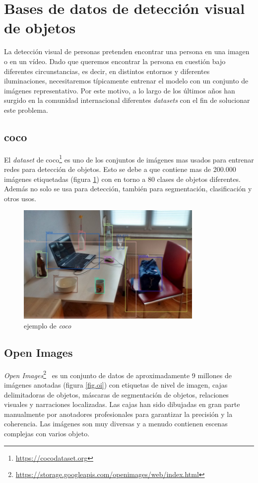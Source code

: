 \section{Bases de datos de detección visual de objetos}
La detección visual de personas pretenden encontrar una persona en una imagen o en un vídeo. Dado que queremos encontrar la persona en cuestión bajo diferentes circunstancias, es decir, en distintos entornos y diferentes iluminaciones, necesitaremos típicamente entrenar el modelo con un conjunto de imágenes representativo. Por este motivo, a lo largo de los últimos años han surgido en la comunidad internacional diferentes \textit{datasets} con el fin de solucionar este problema.

\subsection{\acrfull{coco}}
El \textit{dataset} de \acrfull{coco}\footnote{\url{https://cocodataset.org}}\cite{cocodataset} es uno de los conjuntos de imágenes mas usados para entrenar redes para detección de objetos. Esto se debe a que contiene mas de 200.000 imágenes etiquetadas (figura \ref{fig.coco}) con en torno a 80 clases de objetos diferentes. Además no solo se usa para detección, también para segmentación, clasificación y otros usos.

\begin{figure}[H]
  \begin{center}
    \includegraphics[width=0.8\textwidth]{figures/estado_arte/coco.jpeg}
		\caption{ejemplo de \textit{\acrshort{coco}}}
		\label{fig.coco}
		\end{center}
\end{figure}

\subsection{Open Images}
\textit{Open Images}\footnote{\url{https://storage.googleapis.com/openimages/web/index.html}}~\cite{OpenImages} es un conjunto de datos de aproximadamente 9 millones de imágenes anotadas (figura \ref{fig.oi}) con etiquetas de nivel de imagen, cajas delimitadoras de objetos, máscaras de segmentación de objetos, relaciones visuales y narraciones localizadas. Las cajas han sido dibujadas en gran parte manualmente por anotadores profesionales para garantizar la precisión y la coherencia. Las imágenes son muy diversas y a menudo contienen escenas complejas con varios objeto. 

